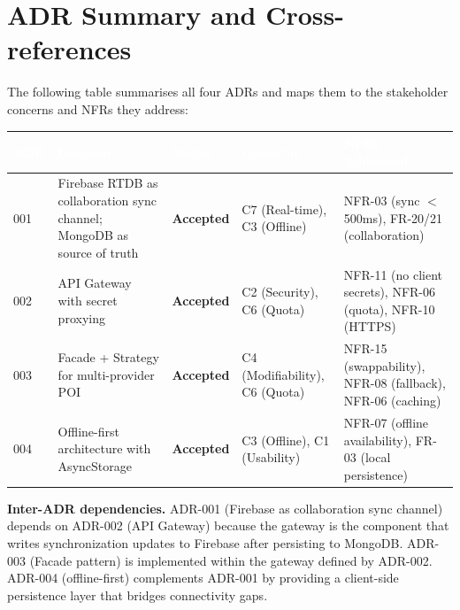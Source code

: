\documentclass[12pt, a4paper]{article}
\newcommand{\thcell}[1]{\textcolor{white}{\textbf{\small #1}}}
\newcommand{\adrstatus}[1]{\textcolor{adrstatus}{\textbf{#1}}}
\begin{document}
\section{ADR Summary and Cross-references}

The following table summarises all four ADRs and maps them to the stakeholder concerns and NFRs they address:

\begin{longtable}{C{1.2cm} L{3.5cm} C{1.5cm} L{2.5cm} L{4.0cm}}
\toprule
{}
\thcell{ADR} & \thcell{Decision} & \thcell{Status} & \thcell{Concerns} & \thcell{NFRs Addressed} \\
\midrule
\endhead
\bottomrule
\endfoot

001 & Firebase RTDB as collaboration sync channel; MongoDB as source of truth & \adrstatus{Accepted} & C7 (Real-time), C3 (Offline) & NFR-03 (sync $<$500ms), FR-20/21 (collaboration) \\

002 & API Gateway with secret proxying & \adrstatus{Accepted} & C2 (Security), C6 (Quota) & NFR-11 (no client secrets), NFR-06 (quota), NFR-10 (HTTPS) \\

003 & Facade + Strategy for multi-provider POI & \adrstatus{Accepted} & C4 (Modifiability), C6 (Quota) & NFR-15 (swappability), NFR-08 (fallback), NFR-06 (caching) \\

004 & Offline-first architecture with AsyncStorage & \adrstatus{Accepted} & C3 (Offline), C1 (Usability) & NFR-07 (offline availability), FR-03 (local persistence) \\

\end{longtable}

\begin{tcolorbox}[notebox]
  \textbf{Inter-ADR dependencies.} ADR-001 (Firebase as collaboration sync channel) depends on ADR-002 (API Gateway) because the gateway is the component that writes synchronization updates to Firebase after persisting to MongoDB. ADR-003 (Facade pattern) is implemented within the gateway defined by ADR-002. ADR-004 (offline-first) complements ADR-001 by providing a client-side persistence layer that bridges connectivity gaps.
\end{tcolorbox}
\end{document}
